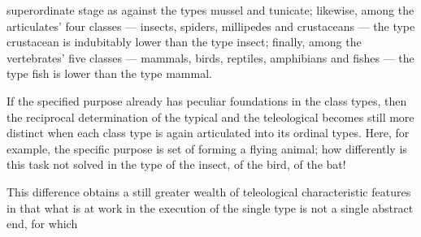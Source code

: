 \documentclass[12pt,a4paper]{book}
\begin{document}
superordinate stage as against the types mussel and tunicate; likewise, among the
articulates' four classes --- insects, spiders, millipedes and crustaceans --- the type
crustacean is indubitably lower than the type insect; finally, among the vertebrates'
five classes --- mammals, birds, reptiles, amphibians and fishes --- the type fish is
lower than the type mammal.

If the specified purpose already has peculiar foundations in the class types, then the
reciprocal determination of the typical and the teleological becomes still more
distinct when each class type is again articulated into its ordinal types. Here, for
example, the specific purpose is set of forming a flying animal; how differently is
this task not solved in the type of the insect, of the bird, of the bat!

This difference obtains a still greater wealth of teleological characteristic features
in that what is at work in the execution of the single type is not a single abstract
end, for which
\end{document}
